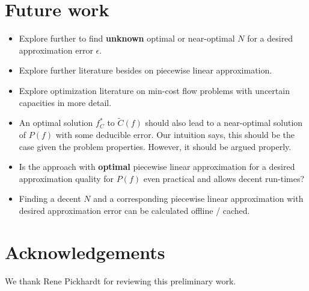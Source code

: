 \documentclass[10pt]{article}
\begin{document}
\section{Future work}

\begin{itemize}
	\item Explore \cite{FRENZEN2010437} further to find \textbf{unknown} optimal or near-optimal $N$ for a desired approximation error $\epsilon$.
	\item Explore further literature besides \cite{Imamoto_optimalpiecewise} on piecewise linear approximation.
	\item Explore optimization literature on min-cost flow problems with uncertain capacities in more detail.
	\item An optimal solution $f_C^*$ to $\tilde{C}(f)$ should also lead to a near-optimal solution of $P(f)$ with some deducible error. Our intuition says, this should be the case given the problem properties. However, it should be argued properly.
	\item Is the approach with \textbf{optimal} piecewise linear approximation for a desired approximation quality for $P(f)$ even practical and allows decent run-times?
	\item Finding a decent $N$ and a corresponding piecewise linear approximation with desired approximation error can be calculated offline / cached.
\end{itemize}

\section{Acknowledgements}

We thank Rene Pickhardt for reviewing this preliminary work.




\end{document}
